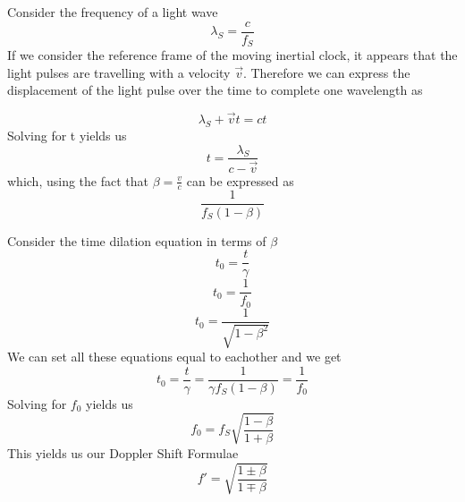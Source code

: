 \documentclass{article}
\begin{document}
Consider the frequency of a light wave
\[
  \lambda_S = \frac{c}{f_S}
\]
If we consider the reference frame of the moving inertial clock, it appears that the light pulses are travelling with a velocity \(\vec{v}\). Therefore we can express the displacement of the light pulse over the time to complete one wavelength as
\begin{center}
  \[
    \lambda_S + \vec{v}t = ct
  \]
  Solving for t yields us
  \[
    t = \frac{\lambda_S}{c - \vec{v}}
  \]
  which, using the fact that \(\beta =  \frac{v}{c}\) can be expressed as
  \[
    \frac{1}{f_S (1 - \beta)}
  \]
  
  Consider the time dilation equation in terms of \(\beta\)
  \[
    t_0 = \frac{t}{\gamma}
  \]
  \[
    t_0 = \frac{1}{f_0}
  \]
  \[
    t_0 = \frac{1}{\sqrt{1 - \beta^2}}
  \]
  We can set all these equations equal to eachother and we get
  \[
    t_0 = \frac{t}{\gamma} = \frac{1}{\gamma f_S (1-\beta)} = \frac{1}{f_0}
  \]
  Solving for \(f_0\) yields us
  \[
    f_0 = f_S \sqrt{\frac{1 - \beta}{1 + \beta}}
  \]
  This yields us our Doppler Shift Formulae
  \[
    f' = \sqrt{\frac{1 \pm \beta}{1 \mp \beta}}
  \]
\end{center}
\end{document}
